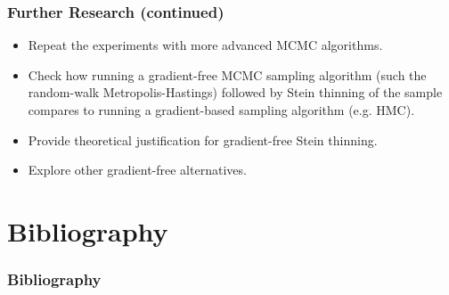 \documentclass{beamer}
\begin{document}
\begin{frame}
\frametitle{Further Research (continued)}

\begin{itemize}

\item Repeat the experiments with more advanced MCMC algorithms. 

\item Check how running a gradient-free MCMC sampling algorithm (such the random-walk Metropolis-Hastings) followed by Stein thinning of the sample compares to running a gradient-based sampling algorithm (e.g. HMC).

\item Provide theoretical justification for gradient-free Stein thinning.

\item Explore other gradient-free alternatives.

\end{itemize}

\end{frame}

\section{Bibliography}

\begin{frame}
\frametitle{Bibliography}




\end{frame}
\end{document}
